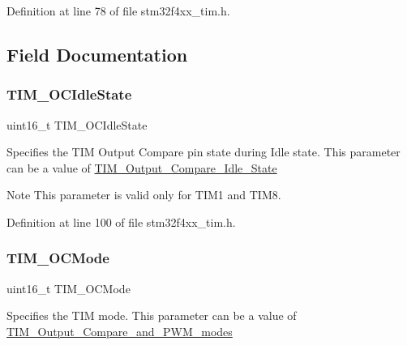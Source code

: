 Definition at line 78 of file stm32f4xx\+\_\+tim.\+h.



\subsection{Field Documentation}
\mbox{\label{struct_t_i_m___o_c_init_type_def_afb328e9ef4de6eb9d78390d7366b9a6e}} 
\subsubsection{\texorpdfstring{T\+I\+M\+\_\+\+O\+C\+Idle\+State}{TIM\_OCIdleState}}
{\footnotesize\ttfamily uint16\+\_\+t T\+I\+M\+\_\+\+O\+C\+Idle\+State}

Specifies the T\+IM Output Compare pin state during Idle state. This parameter can be a value of \hyperlink{group___t_i_m___output___compare___idle___state}{T\+I\+M\+\_\+\+Output\+\_\+\+Compare\+\_\+\+Idle\+\_\+\+State} \begin{DoxyNote}{Note}
This parameter is valid only for T\+I\+M1 and T\+I\+M8. 
\end{DoxyNote}


Definition at line 100 of file stm32f4xx\+\_\+tim.\+h.

\mbox{\label{struct_t_i_m___o_c_init_type_def_afa69e616eb0b11bd238062dd8a5ceaa5}} 
\subsubsection{\texorpdfstring{T\+I\+M\+\_\+\+O\+C\+Mode}{TIM\_OCMode}}
{\footnotesize\ttfamily uint16\+\_\+t T\+I\+M\+\_\+\+O\+C\+Mode}

Specifies the T\+IM mode. This parameter can be a value of \hyperlink{group___t_i_m___output___compare__and___p_w_m__modes}{T\+I\+M\+\_\+\+Output\+\_\+\+Compare\+\_\+and\+\_\+\+P\+W\+M\+\_\+modes} 

